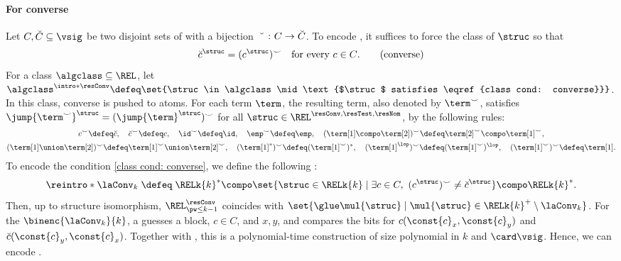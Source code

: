 \paragraph*{For converse}
Let $C, \breve{C} \subseteq \vsig$ be two disjoint sets of  with a bijection $\breve{\mbox{\quad}} \colon C \to \breve{C}$.
To encode \intro*{}, it suffices to force the class of  $\struc$
so that
\begin{align*}
\breve{c}^{\struc} = (c^{\struc})^{\smile} \text{\quad for every $c \in C$.} \tag{converse}\label{class cond: converse}
\end{align*}
\AP
For a class $\algclass \subseteq \REL$,
let $\algclass^{\intro*\resConv} \defeq \set{\struc \in \algclass \mid \text{$\struc$ satisfies \eqref{class cond: converse}}}$.
In this class, converse is pushed to atoms.
For each term $\term$, the resulting term, also denoted by $\term^{\smile}$, satisfies
$\jump{\term^{\smile}}^{\struc} = (\jump{\term}^{\struc})^{\smile}$ for all
$\struc \in \REL^{\resConv,\resTest,\resNom}$, by the following rules:
\begin{gather*}
    c^{\smile} \defeq \breve{c}, \quad
    \breve{c}^{\smile} \defeq c, \quad
    \id^{\smile} \defeq \id, \quad
    \emp^{\smile} \defeq \emp, \quad
    (\term[1] \compo \term[2])^{\smile} \defeq \term[2]^{\smile} \compo \term[1]^{\smile}, \\
    (\term[1] \union \term[2])^{\smile} \defeq \term[1]^{\smile} \union \term[2]^{\smile}, \quad
    (\term[1]^{*})^{\smile} \defeq (\term[1]^{\smile})^{*}, \quad
    (\term[1]^{\lop})^{\smile} \defeq (\term[1]^{\smile})^{\lop}, \quad
    (\term[1]^{\smile})^{\smile} \defeq \term[1].
\end{gather*}
To encode the condition \eqref{class cond: converse}, we define the following :
\AP
{}
\[\reintro*\laConv_{k} \;\defeq\;
\RELk{k}^{*} \compo
\set{\struc \in \RELk{k} \mid \exists c \in C,\ (c^{\struc})^{\smile} \neq \breve{c}^{\struc} } \compo 
\RELk{k}^{*}.\]
Then, up to structure isomorphism,
$\REL^{\resConv}_{\pw \le k-1}$ coincides with
$\set{\glue \mul{\struc} \mid \mul{\struc} \in \RELk{k}^{+} \setminus \laConv_{k}}$.
For the  $\binenc{\laConv_{k}}{k}$,
a  guesses a block, $c\in C$, and $x,y$, and compares the bits for
$c(\const{c}_x,\const{c}_y)$ and $\breve c(\const{c}_y,\const{c}_x)$.
Together with , this is a polynomial-time construction
of size polynomial in $k$ and $\card\vsig$.
Hence, we can encode .

